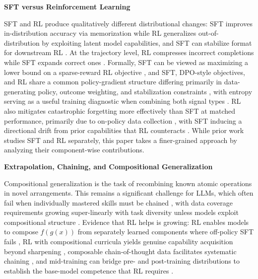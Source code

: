\documentclass{article}
\begin{document}
\textbf{SFT versus Reinforcement Learning}

SFT and RL produce qualitatively different distributional changes: SFT improves in-distribution accuracy via memorization while RL generalizes out-of-distribution by exploiting latent model capabilities, and SFT can stabilize format for downstream RL \citep{chuSFTMemorizesRL2025}. At the trajectory level, RL compresses incorrect completions while SFT expands correct ones \citep{matsutaniRLSqueezesSFT2025}. Formally, SFT can be viewed as maximizing a lower bound on a sparse-reward RL objective \citep{qinSupervisedFineTuning2025}, and SFT, DPO-style objectives, and RL share a common policy-gradient structure differing primarily in data-generating policy, outcome weighting, and stabilization constraints \citep{lvUnifiedViewLarge2026}, with entropy serving as a useful training diagnostic when combining both signal types \citep{fuSRFTSingleStageMethod2025}. RL also mitigates catastrophic forgetting more effectively than SFT at matched performance, primarily due to on-policy data collection \citep{chenRetainingDoingRole2025,laiReinforcementFineTuningNaturally2026}, with SFT inducing a directional drift from prior capabilities that RL counteracts \citep{wuGeneralizationSFTReinforcement2025}. While prior work studies SFT and RL separately, this paper takes a finer-grained approach by analyzing their component-wise contributions.



\textbf{Extrapolation, Chaining, and Compositional Generalization}

Compositional generalization is the task of recombining known atomic operations in novel arrangements. This remains a significant challenge for LLMs, which often fail when individually mastered skills must be chained \citep{pressMeasuringNarrowingCompositionality2023,zhaoExploringCompositionalDeficiency2024,sunOMEGACanLLMs2025}, with data coverage requirements growing super-linearly with task diversity unless models exploit compositional structure \citep{abedsoltanTaskGeneralizationAutoRegressive2025}. Evidence that RL helps is growing: RL enables models to compose $f(g(x))$ from separately learned components where off-policy SFT fails \citep{yuanLLMsLearnNewSkills2025}, RL with compositional curricula yields genuine capability acquisition beyond sharpening \citep{motwaniH1BootstrappingLLMs2025}, composable chain-of-thought data facilitates systematic chaining \citep{yinLearningComposableChainsofThought2025}, and mid-training can bridge pre- and post-training distributions to establish the base-model competence that RL requires \citep{zhangInterplayPreTrainingMidTraining2025}.
\end{document}
